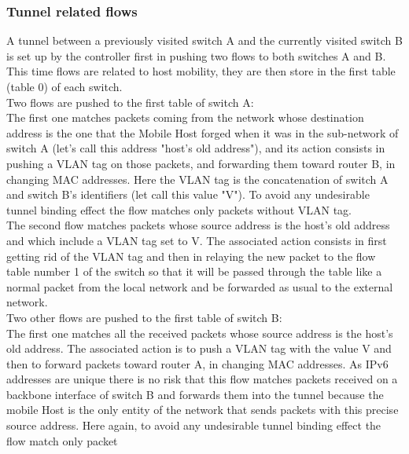 \documentclass{article}
\begin{document}
\subsubsection{Tunnel related flows}

A tunnel between a previously visited switch A and the currently
visited switch B is set up by the controller first in pushing two
flows to both switches A and B. This time flows are related to host
mobility, they are then store in the first table (table 0) of each
switch.\\
\newline
Two flows are pushed to the first table of switch A:\\
\newline
The first one matches packets coming from the network whose
destination address is the one that the Mobile Host forged when it
was in the sub-network of switch A (let's call this address
"host's old address"), and its action consists in pushing a VLAN
tag on those packets, and forwarding them toward router B, in
changing MAC addresses. Here the VLAN tag is the concatenation of
switch A and switch B's identifiers (let call this value "V"). To
avoid any undesirable tunnel binding effect the flow matches only
packets without VLAN tag.\\
\newline
The second flow matches packets whose source address is the host's
old address and which include a VLAN tag set to V. The
associated action consists in first getting rid of the VLAN tag
and then in relaying the new packet to the flow table number 1 of
the switch so that it will be passed through the table like a
normal packet from the local network and be forwarded as usual to
the external network.\\
\newline
Two other flows are pushed to the first table of switch B:\\
\newline
The first one matches all the received packets whose source address
is the host's old address. The associated action is to push a VLAN
tag with the value V and then to forward packets toward router A,
in changing MAC addresses. As IPv6 addresses are unique there is
no risk that this flow matches packets received on a backbone
interface of switch B and forwards them into the tunnel because
the mobile Host is the only entity of the network that sends
packets with this precise source address. Here again, to avoid any
undesirable tunnel binding effect the flow match only packet
\end{document}
